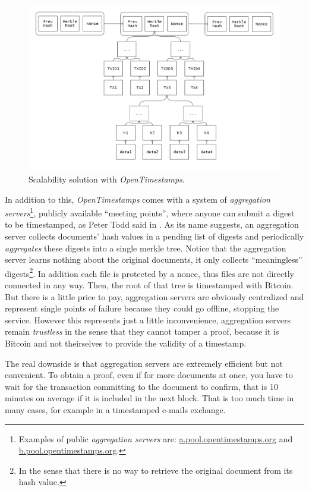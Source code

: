\begin{figure}[ht]
    \centering
	\includegraphics[width=0.9\linewidth]{Images/bitcoin-chain-calendar.png}
	\caption{Scalability solution with \textit{OpenTimestamps}.}
	\label{fig:scalability}
\end{figure}

\bigskip
\noindent
In addition to this, \textit{OpenTimestamps} comes with a system of \textit{aggregation servers}\textup{\footnote{Examples of public \textit{aggregation servers} are: \url{a.pool.opentimestamps.org} and \url{b.pool.opentimestamps.org}.}}, publicly available \enquote{meeting points}, where anyone can submit a digest to be timestamped, as Peter Todd said in \cite{OTSannouncment}. As its name suggests, an aggregation server collects documents' hash values in a pending list of digests and periodically \textit{aggregates} these digests into a single merkle tree. Notice that the aggregation server learns nothing about the original documents, it only collects \enquote{meaningless} digests\footnote{In the sense that there is no way to retrieve the original document from its hash value.}. In addition each file is protected by a nonce, thus files are not directly connected in any way. Then, the root of that tree is timestamped with Bitcoin. But there is a little price to pay, aggregation servers are obviously centralized and represent single points of failure because they could go offline, stopping the service. However this represents just a little inconvenience, aggregation servers remain \textit{trustless} in the sense that they cannot tamper a proof, because it is Bitcoin and not theirselves to provide the validity of a timestamp.

\newpage
\noindent
The real downside is that aggregation servers are extremely efficient but not convenient. To obtain a proof, even if for more documents at once, you have to wait for the transaction committing to the document to confirm, that is 10 minutes on average if it is included in the next block. That is too much time in many cases, for example in a timestamped e-mails exchange.

